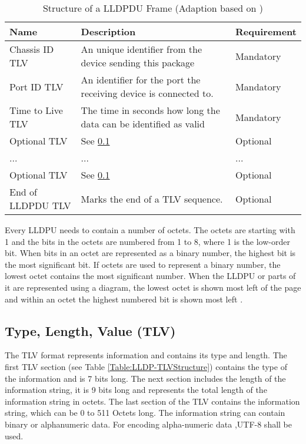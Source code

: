 \begin{table}[ht]
    \begin{tabularx}{\linewidth}{|L{10em}|X|L{6em}|}
    \hline
    \textbf{Name}     & \textbf{Description}                                             & \textbf{Requirement} \\
    \hline
    Chassis ID TLV    & An unique identifier from the device sending this package        & Mandatory \\
    \hline
    Port ID TLV       & An identifier for the port the receiving device is connected to. & Mandatory \\
    \hline
    Time to Live TLV  & The time in seconds how long the data can be identified as valid & Mandatory \\
    \hline
    Optional TLV      & See \ref{Section:LLDP-TLV}                                       & Optional  \\
    \hline
    ...               & ...                                                              & ...       \\
    \hline
    Optional TLV      & See \ref{Section:LLDP-TLV}                                      & Optional  \\
    \hline
    End of LLDPDU TLV & Marks the end of a TLV sequence.                                 & Optional \\
    \hline
    \end{tabularx}
    \caption{Structure of a LLDPDU Frame (Adaption based on \cite{IEEE:LLDP:2016})}
    \label{Table:LLDP-LLDPDUFrame}
\end{table}

Every LLDPU needs to contain a number of octets. The octets are starting with 1 and the bits in the octets are numbered from 1 to 8, where 1 is the low-order bit. When bits in an octet are represented as a binary number, the highest bit is the most significant bit. If octets are used to represent a binary number, the lowest octet contains the most significant number. When the LLDPU or parts of it are represented using a diagram, the lowest octet is shown most left of the page and within an octet the highest numbered bit is shown most left \cite{IEEE:LLDP:2016}.

\subsection{Type, Length, Value (TLV)}
\label{Section:LLDP-TLV}
The TLV format represents information and contains its type and length. The first TLV section (see Table \ref{Table:LLDP-TLVStructure}) contains the type of the information and is 7 bits long. The next section includes the length of the information string, it is 9 bits long and represents the total length of the information string in octets. The last section of the TLV contains the information string, which can be 0 to 511 Octets long. The information string can contain binary or alphanumeric data. For encoding alpha-numeric data ,UTF-8 \cite{RFC:RFC3629:2003} shall be used.

